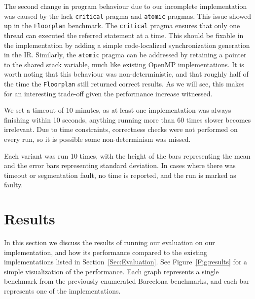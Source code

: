 \documentclass[sigconf]{acmart}
\begin{document}
The second change in program behaviour due to our incomplete implementation was
caused by the lack \texttt{critical} pragma and \texttt{atomic} pragmas. This
issue showed up in the \texttt{Floorplan} benchmark. The \texttt{critical} pragma
ensures that only one thread can executed the referred statement at a time. 
This should be fixable in the implementation by adding a simple code-localized
synchronization generation in the IR. Similarly, the \texttt{atomic} pragma 
can be addressed by retaining a pointer to the shared stack variable, much like
existing OpenMP implementations. It is worth noting that this behaviour was
non-deterministic, and that roughly half of the time the \texttt{Floorplan}
still returned correct results. As we will see, this makes for an interesting
trade-off given the performance increase witnessed.

We set a timeout of 10 minutes, as at least one implementation was always
finishing within 10 seconds, anything running more than 60 times slower becomes
irrelevant. Due to time constraints, correctness checks were not performed on
every run, so it is possible some non-determinism was missed. 

Each variant was run 10 times, with the height of the bars representing the
mean and the error bars representing standard deviation. In cases where there
was timeout or segmentation fault, no time is reported, and the run is marked
as faulty. 

\section{Results} \label{Sec:Results}

In this section we discuss the results of running our evaluation on our
implementation, and how its performance compared to the existing
implementations listed in Section~\ref{Sec:Evaluation}. See
Figure~\ref{Fig:results} for a simple visualization of the performance. Each
graph represents a single benchmark from the previously enumerated Barcelona
benchmarks, and each bar represents one of the implementations. 
\end{document}
